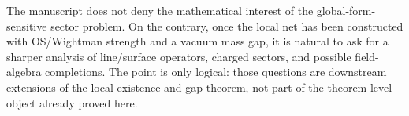 \begin{remark}
The manuscript does not deny the mathematical interest of the global-form-sensitive sector problem.
On the contrary, once the local net has been constructed with OS/Wightman strength and a vacuum mass gap, it is natural to ask for a sharper analysis of line/surface operators, charged sectors, and possible field-algebra completions.
The point is only logical: those questions are downstream extensions of the local existence-and-gap theorem, not part of the theorem-level object already proved here.
\end{remark}
